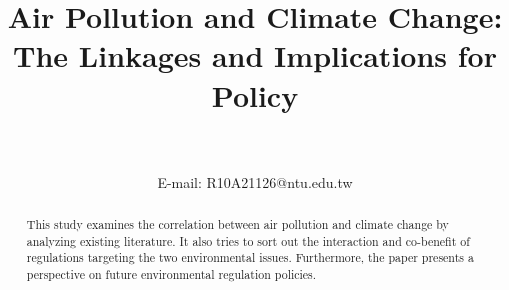 \documentclass[]{article}
\begin{document}




\title{Air Pollution and Climate Change:\\ The Linkages and Implications for Policy}
\author{\textbf{\fontsize{14pt}{16.4pt}\selectfont{YIFAN WANG}}~\\\normalsize{}~\\{\normalsize\normalfont  E-mail: R10A21126@ntu.edu.tw}}
\def\RunningHead{{Air Pollution and Climate Change}}

\maketitle 


\begin{abstract}


  This study examines the correlation between air pollution and climate change by analyzing existing literature. It also tries to sort out the interaction and co-benefit of regulations targeting the two environmental issues. Furthermore, the paper presents a perspective on future environmental regulation policies.



  

\end{abstract}
\end{document}
